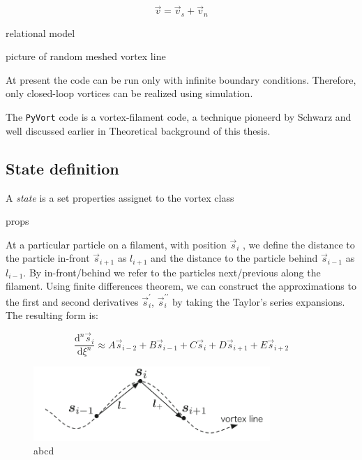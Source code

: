 \begin{equation}
\vec{v} = \vec{v}_s + \vec{v}_n
\end{equation}

\todo relational model

\todo picture of random meshed vortex line

At present the code can be run only with infinite boundary conditions. Therefore, only closed-loop vortices can be realized using simulation.

The \texttt{PyVort} code is a vortex-filament code, a technique pioneerd by Schwarz and well discussed earlier in Theoretical background of this thesis.

\subsection*{State definition}

A \textit{state} is a set properties assignet to the vortex class

\todo props

At a particular particle on a filament, with position $\vec{s}_i$ , we define the distance
to the particle in-front $\vec{s}_{i+1}$ as $l_{i+1}$ and the distance to the particle behind $\vec{s}_{i-1}$ as $l_{i-1}$. By in-front/behind we refer to the particles next/previous
along the filament. Using finite differences theorem, we can construct the approximations to the first and second derivatives $\vec{s}_i^{\prime}$, $\vec{s}_i^{\prime\prime}$ by taking the Taylor's series expansions. The resulting form is:

\begin{equation}
\frac{\text{d}^n\vec{s}_i}{\text{d}\xi^n} \approx
A\vec{s}_{i-2} + B\vec{s}_{i-1} + C\vec{s}_{i} + D\vec{s}_{i+1} + E\vec{s}_{i+2}
\end{equation}

\begin{figure}[h]
	\centering
	\includegraphics[width=0.8\textwidth]{graphics/simul/finite-diff}
	\caption{abcd}
\end{figure}





